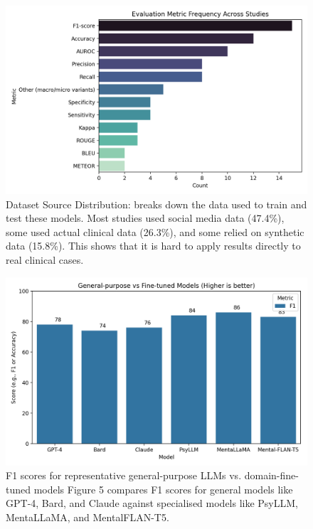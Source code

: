 \documentclass[sn-basic,authoryear]{sn-jnl}
\begin{document}
\begin{figure}
    \centering
    \includegraphics[width=1.0\linewidth]{chart (2).png}
    \caption{Dataset Source Distribution:
  breaks down the data used to train and test these models. Most studies used social media data (47.4\%), some used actual clinical data (26.3\%), and some relied on synthetic data (15.8\%). This shows that it is hard to apply results directly to real clinical cases.
}
    \label{fig:placeholder}
\end{figure}
\begin{figure}
    \centering
    \includegraphics[width=1.0\linewidth]{chart (5).png}
    \caption{F1 scores for representative general-purpose LLMs vs. domain-fine-tuned models
Figure 5 compares F1 scores for general models like GPT-4, Bard, and Claude against specialised models like PsyLLM, MentaLLaMA, and MentalFLAN-T5.
}
    \label{fig:model_performance_chart}
\end{figure}
\end{document}
